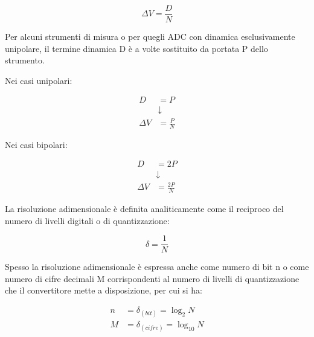 {
    \Large 
    \begin{equation}
        \Delta V = \frac{D}{N}
    \end{equation}
}

Per alcuni strumenti di misura o per quegli ADC con dinamica esclusivamente unipolare, 
il termine dinamica D è a volte sostituito da portata P dello strumento. \newline 

Nei casi unipolari: 

{
    \Large 
    \begin{equation}
        \begin{split}
        D &= P
        \\ 
        &\downarrow
        \\ 
        \Delta V &= \frac{P}{N}      
        \end{split}
    \end{equation}
}

Nei casi bipolari: 

{
    \Large 
    \begin{equation}
        \begin{split}
        D &= 2P
        \\ 
        &\downarrow
        \\ 
        \Delta V &= \frac{2P}{N}      
        \end{split}
    \end{equation}
}

La risoluzione adimensionale è definita analiticamente come il reciproco del numero di livelli digitali o di quantizzazione: 

{
    \Large 
    \begin{equation}
        \delta = \frac{1}{N}
    \end{equation}
}

Spesso la risoluzione adimensionale è espressa anche come numero di bit n o come numero di cifre decimali M corrispondenti 
al numero di livelli di quantizzazione che il convertitore mette a disposizione, per cui si ha: 

{
    \Large 
    \begin{equation}
        \begin{split}
            n &= \delta_{(bit)} = \log_2 N 
            \\ 
            M &= \delta_{(cifre)} = \log_{10} N
        \end{split}
    \end{equation}
}

